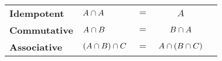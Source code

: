 
\begin{tabular}{llrcl}
  \textbf{Idempotent}  & $A \cap A$            & $=$ & $A$ \\
  \textbf{Commutative} & $A \cap B$            & $=$ & $B \cap A$ \\
  \textbf{Associative} & $(A \cap B) \cap C$ & $=$ & $A \cap (B \cap C)$
\end{tabular}


